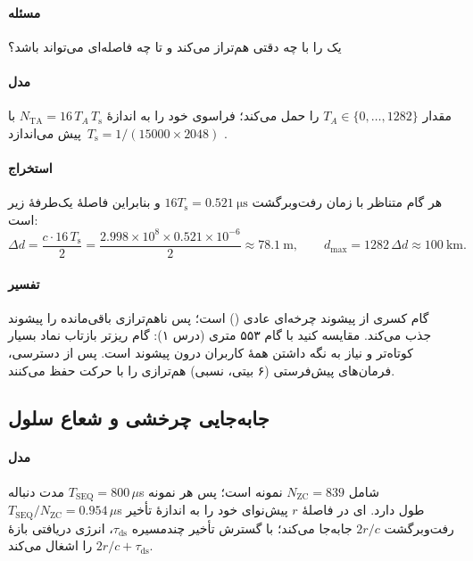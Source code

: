 \documentclass[11pt,a4paper]{article}
\begin{document}
\paragraph{مسئله}  یک  را با چه دقتی هم‌تراز می‌کند و  تا چه فاصله‌ای می‌تواند باشد؟
\paragraph{مدل}  مقدار $T_A\in\{0,\dots,1282\}$ را حمل می‌کند؛  فراسوی خود را به اندازهٔ
$N_{\mathrm{TA}} = 16\,T_A\,T_\mathrm{s}$ با $T_\mathrm{s} = 1/(15000\times2048)$\, پیش می‌اندازد \cite{ts36213}.
\paragraph{استخراج} هر گام متناظر با زمان رفت‌وبرگشت $16T_\mathrm{s} = \qty{0.521}{\micro\second}$ و بنابراین فاصلهٔ یک‌طرفهٔ زیر است:
\begin{equation}\label{eq:tastep}
  \Delta d = \frac{c \cdot 16\,T_\mathrm{s}}{2} = \frac{2.998\times10^8\times0.521\times10^{-6}}{2} \approx \qty{78.1}{\metre},
  \qquad d_{\max} = 1282\,\Delta d \approx \qty{100}{\kilo\metre}.
\end{equation}
\paragraph{تفسیر} گام کسری از پیشوند چرخه‌ای عادی () است؛ پس ناهم‌ترازی باقی‌مانده را پیشوند
جذب می‌کند. مقایسه کنید با گام ۵۵۳ متری  (درس ۱): گام ریزتر بازتاب نماد بسیار کوتاه‌تر  و
نیاز به نگه داشتن همهٔ کاربران درون پیشوند است. پس از دسترسی، فرمان‌های پیش‌فرستی  (۶ بیتی، نسبی)
هم‌ترازی را با حرکت  حفظ می‌کنند.

\subsection{جابه‌جایی چرخشی و شعاع سلول}\label{sec:ncs}
\paragraph{مدل} مدت دنباله $T_{\mathrm{SEQ}} = 800\,\mu$s شامل $N_{\mathrm{ZC}} = 839$ نمونه است؛ پس هر نمونه
$T_{\mathrm{SEQ}}/N_{\mathrm{ZC}} = 0.954\,\mu$s طول دارد. ای در فاصلهٔ $r$ پیش‌نوای خود را به اندازهٔ تأخیر
رفت‌وبرگشت $2r/c$ جابه‌جا می‌کند؛ با گسترش تأخیر چندمسیره $\tau_{\mathrm{ds}}$، انرژی دریافتی بازهٔ
$2r/c + \tau_{\mathrm{ds}}$ را اشغال می‌کند.
\end{document}
